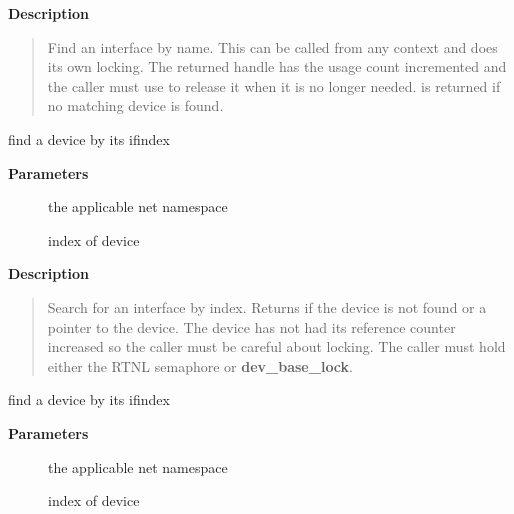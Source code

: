 \documentclass[a4paper,8pt,english]{sphinxmanual}
\begin{document}
\textbf{Description}
\begin{quote}

Find an interface by name. This can be called from any
context and does its own locking. The returned handle has
the usage count incremented and the caller must use {\hyperref[networking/kapi:c.dev_put]{\emph{}}} to
release it when it is no longer needed.  is returned if no
matching device is found.
\end{quote}

\begin{fulllineitems}
\label{networking/kapi:c.__dev_get_by_index}
find a device by its ifindex

\end{fulllineitems}


\textbf{Parameters}
\begin{description}
\item[{}] \leavevmode
the applicable net namespace

\item[{}] \leavevmode
index of device

\end{description}

\textbf{Description}
\begin{quote}

Search for an interface by index. Returns  if the device
is not found or a pointer to the device. The device has not
had its reference counter increased so the caller must be careful
about locking. The caller must hold either the RTNL semaphore
or \textbf{dev\_base\_lock}.
\end{quote}

\begin{fulllineitems}
\label{networking/kapi:c.dev_get_by_index_rcu}
find a device by its ifindex

\end{fulllineitems}


\textbf{Parameters}
\begin{description}
\item[{}] \leavevmode
the applicable net namespace

\item[{}] \leavevmode
index of device

\end{description}
\end{document}
